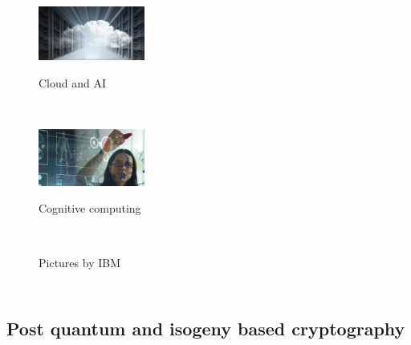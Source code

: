 \documentclass[10pt]{beamer}
\theoremstyle{plain}
\theoremstyle{definition}
\renewcommand{\(}{\left(}
\renewcommand{\)}{\right)}
\begin{document}
\begin{frame}
\begin{columns}[t]

\begin{figure}
\includegraphics[width=3.5cm]
{cloud_and_AI.png} 

Cloud and AI

\vspace{0.1cm}

{\\}

\vspace{0.3cm}

\includegraphics[width=3.5cm]
{cognitive_computing.jpg}

Cognitive computing

\vspace{0.1cm}

{\\}

\vspace{0.05 cm}

{\tiny Pictures by IBM}
\end{figure}
\end{columns}

\end{frame}


\subsection{Post quantum and isogeny based cryptography}
\end{document}
